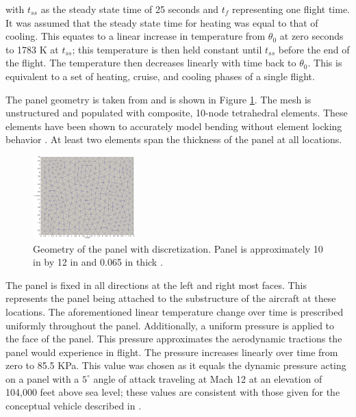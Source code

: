 \documentclass[conf]{new-aiaa}
\begin{document}
\noindent
with $t_{ss}$ as the steady state time of 25 seconds
and $t_f$ representing one flight time.
It was assumed that the steady state time for heating was
equal to that of cooling.
This equates to a linear increase in temperature from 
$\theta_0$ at zero seconds to 1783 K at $t_{ss}$;
this temperature is then held constant until $t_{ss}$ before
the end of the flight.
The temperature then decreases linearly with time back to $\theta_0$.
This is equivalent to a set of heating, cruise, and cooling phases of a single flight.

The panel geometry is taken from 
\cite{culler_impact_of_FTS_coupling_on_response_prediction_hypersonic_skin_panels}
and is shown in Figure \ref{fig_panel_face_mesh}.
The mesh is unstructured and populated with composite, 10-node tetrahedral elements.
These elements have been shown to accurately model bending 
without element locking behavior
\cite{ostien_10_node_comp_tet_FE_for_solid_mechanics, 
  clough_automated_wing_internal_structure_placement_guided_by_FEA}.
At least two elements span the thickness of the panel at all locations. 


\begin{figure}[H] 
  \centering
    \includegraphics[width=0.35\textwidth, keepaspectratio]
    {panel_face_mesh}
  \caption{ Geometry of the panel with discretization. 
            Panel is approximately 10 in by 12 in and 0.065 in thick
            \cite{culler_impact_of_FTS_coupling_on_response_prediction_hypersonic_skin_panels}.}
  \label{fig_panel_face_mesh}
\end{figure}

\noindent
The panel is fixed in all directions at the left and right most
faces. 
This represents the panel being attached to the substructure of the aircraft
at these locations.
The aforementioned linear temperature change over time is prescribed
uniformly throughout the panel.
Additionally, a uniform pressure is applied to the face of the panel.
This pressure approximates the aerodynamic tractions the 
panel would experience in flight. 
The pressure increases linearly over time from zero to 85.5 KPa. 
This value was chosen as it equals the dynamic pressure
acting on a panel with a $5^{\circ}$ angle of attack
traveling at Mach 12 at an elevation of 104,000 feet above sea level;
these values are consistent with those given
for the conceptual vehicle described in 
\cite{culler_impact_of_FTS_coupling_on_response_prediction_hypersonic_skin_panels}.
\end{document}
